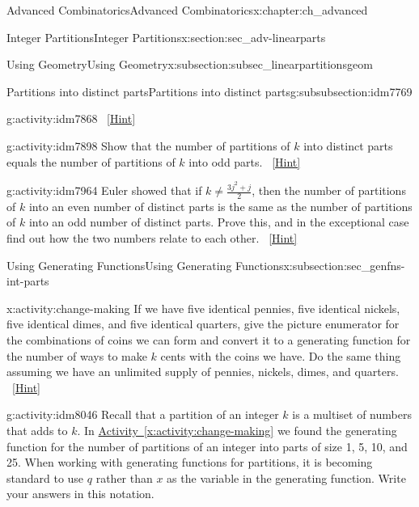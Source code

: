 \documentclass[oneside,10pt,]{book}
\numberwithin{equation}{chapter}
\begin{document}
\begin{chapterptx}{Advanced Combinatorics}{}{Advanced Combinatorics}{}{}{x:chapter:ch_advanced}
\begin{sectionptx}{Integer Partitions}{}{Integer Partitions}{}{}{x:section:sec_adv-linearparts}
\begin{subsectionptx}{Using Geometry}{}{Using Geometry}{}{}{x:subsection:subsec_linearpartitionsgeom}
\begin{subsubsectionptx}{Partitions into distinct parts}{}{Partitions into distinct parts}{}{}{g:subsubsection:idm7769}
\begin{activity}{}{g:activity:idm7868}
\qquad~\hfill{\tiny\hyperlink{g:hint:idm7874-back}{[Hint]}}\end{activity}
\begin{activity}{}{g:activity:idm7898}%
Show that the number of partitions of \(k\) into distinct parts equals the number of partitions of \(k\) into odd parts.%
\qquad~\hfill{\tiny\hyperlink{g:hint:idm7903-back}{[Hint]}}\end{activity}
\begin{activity}{}{g:activity:idm7964}%
Euler showed that if \(k\not= \frac{3j^2+j}{2}\), then the number of partitions of \(k\) into an even number of distinct parts is the same as the number of partitions of \(k\) into an odd number of distinct parts. Prove this, and in the exceptional case find out how the two numbers relate to each other.%
\qquad~\hfill{\tiny\hyperlink{g:hint:idm7970-back}{[Hint]}}\end{activity}
\end{subsubsectionptx}
\end{subsectionptx}
%
%
\typeout{************************************************}
\typeout{************************************************}
%
\begin{subsectionptx}{Using Generating Functions}{}{Using Generating Functions}{}{}{x:subsection:sec_genfns-int-parts}
\begin{activity}{}{x:activity:change-making}%
If we have five identical pennies, five identical nickels, five identical dimes, and five identical quarters, give the picture enumerator for the combinations of coins we can form and convert it to a generating function for the number of ways to make \(k\) cents with the coins we have. Do the same thing assuming we have an unlimited supply of pennies, nickels, dimes, and quarters.%
\qquad~\hfill{\tiny\hyperlink{g:hint:idm8028-back}{[Hint]}}\end{activity}
\begin{activity}{}{g:activity:idm8046}%
Recall that a partition of an integer \(k\) is a multiset of numbers that adds to \(k\). In \hyperref[x:activity:change-making]{Activity~\ref{x:activity:change-making}} we found the generating function for the number of partitions of an integer into parts of size 1, 5, 10, and 25. When working with generating functions for partitions, it is becoming standard to use \(q\) rather than \(x\) as the variable in the generating function.  Write your answers in this notation.\footnotemark{}%
\begin{enumerate}[font=\bfseries,label=(\alph*),ref=\alph*]

\end{enumerate}
\end{activity}
\end{subsectionptx}
\end{sectionptx}
\end{chapterptx}
\end{document}
